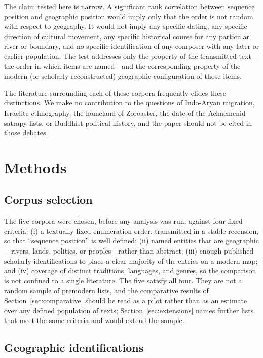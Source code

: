 \documentclass[11pt]{article}
\begin{document}
The claim tested here is narrow. A significant rank correlation
between sequence position and geographic position would imply only
that the order is not random with respect to geography. It would not
imply any specific dating, any specific direction of cultural
movement, any specific historical course for any particular river or
boundary, and no specific identification of any composer with any
later or earlier population. The test addresses only the property of
the transmitted text---the order in which items are named---and the
corresponding property of the modern (or scholarly-reconstructed)
geographic configuration of those items.

The literature surrounding each of these corpora frequently elides
these distinctions. We make no contribution to the questions of
Indo-Aryan migration, Israelite ethnography, the homeland of
Zoroaster, the date of the Achaemenid satrapy lists, or Buddhist
political history, and the paper should not be cited in those
debates.

\section{Methods}\label{sec:methods}

\subsection{Corpus selection}\label{sec:selection}

The five corpora were chosen, before any analysis was run, against
four fixed criteria: (i) a textually fixed enumeration order,
transmitted in a stable recension, so that ``sequence position'' is
well defined; (ii) named entities that are geographic---rivers,
lands, polities, or peoples---rather than abstract; (iii) enough
published scholarly identifications to place a clear majority of the
entries on a modern map; and (iv) coverage of distinct traditions,
languages, and genres, so the comparison is not confined to a single
literature. The five satisfy all four. They are not a random sample
of premodern lists, and the comparative results of
Section~\ref{sec:comparative} should be read as a pilot rather than
as an estimate over any defined population of texts;
Section~\ref{sec:extensions} names further lists that meet the same
criteria and would extend the sample.

\subsection{Geographic identifications}\label{sec:ids}
\end{document}
